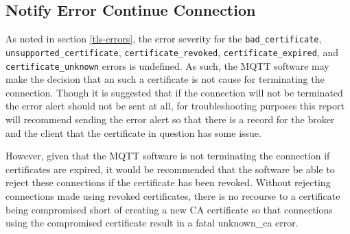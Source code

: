 \documentclass[12pt]{article}
\begin{document}
\subsection{Notify Error Continue Connection}
As noted in section \ref{tls-errors}, the error severity for the \texttt{bad\_certificate},\\\texttt{unsupported\_certificate}, \texttt{certificate\_revoked}, \texttt{certificate\_expired}, and \texttt{certificate\_unknown} errors is undefined. As such, the MQTT software may make the decision that an such a certificate is not cause for terminating the connection. Though it is suggested that if the connection will not be terminated the error alert should not be sent at all, for troubleshooting purposes this report will recommend sending the error alert so that there is a record for the broker and the client that the certificate in question has some issue.\par
However, given that the MQTT software is not terminating the connection if certificates are expired, it would be recommended that the software be able to reject these connections if the certificate has been revoked. Without rejecting connections made using revoked certificates, there is no recourse to a certificate being compromised short of creating a new CA certificate so that connections using the compromised certificate result in a fatal unknown\_ca error.
\end{document}
